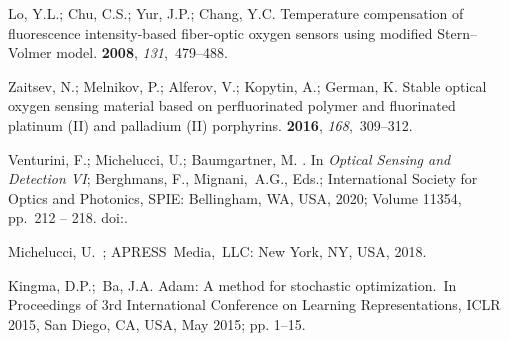 \documentclass[sensors,article,accept,moreauthors,pdftex,10pt,a4paper]{Definitions/mdpi}
\theoremstyle{definition}
\begin{document}
\begin{thebibliography}{999}
Lo, Y.L.; Chu, C.S.; Yur, J.P.; Chang, Y.C.
\newblock Temperature compensation of fluorescence intensity-based fiber-optic
  oxygen sensors using modified Stern--Volmer model.
 {\bf 2008}, {\em
  131},~479--488.

Zaitsev, N.; Melnikov, P.; Alferov, V.; Kopytin, A.; German, K.
\newblock Stable optical oxygen sensing material based on perfluorinated
  polymer and fluorinated platinum (II) and palladium (II) porphyrins.
 {\bf 2016}, {\em 168},~309--312.

Venturini, F.; Michelucci, U.; Baumgartner, M.
.
\newblock  In \emph{Optical Sensing and Detection VI}; Berghmans, F., Mignani,~A.G., Eds.;
  International Society for Optics and Photonics, SPIE: Bellingham, WA, USA,  2020; Volume 11354, pp.~212 -- 218.
\newblock
  doi:{\href{https://doi.org/10.1117/12.2554941}{}}.

Michelucci, U.~; APRESS~Media,~LLC: New York, NY, USA, 2018. %
 

Kingma, D.P.;~Ba, J.A.
\newblock Adam: A method for stochastic optimization.~\newblock In Proceedings of 3rd International Conference on Learning
  Representations, ICLR 2015, San Diego, CA, USA, May 2015; pp. 1--15. %

\end{thebibliography}

\end{document}

